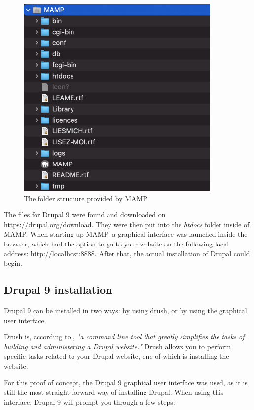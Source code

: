 \begin{figure}
	\centering
	\includegraphics[width=10cm]{./img/MAMP_Structure.png}
	\caption[MAMP folder structure]{The folder structure provided by MAMP}
	\label{fig:MAMP_Structure}
\end{figure}

The files for Drupal 9 were found and downloaded on \url{https://drupal.org/download}. They were then put into the \emph{htdocs} folder inside of MAMP. When starting up MAMP, a graphical interface was launched inside the browser, which had the option to go to your website on the following local address: http://localhost:8888. After that, the actual installation of Drupal could begin.

\subsection{Drupal 9 installation}

Drupal 9 can be installed in two ways: by using drush, or by using the graphical user interface. 

Drush is, according to \textcite{Tomlinson2015}, \emph{"a command line tool that greatly simplifies the tasks of building and administering a Drupal website."} Drush allows you to perform specific tasks related to your Drupal website, one of which is installing the website.

For this proof of concept, the Drupal 9 graphical user interface was used, as it is still the most straight forward way of installing Drupal. When using this interface, Drupal 9 will prompt you through a few steps:

